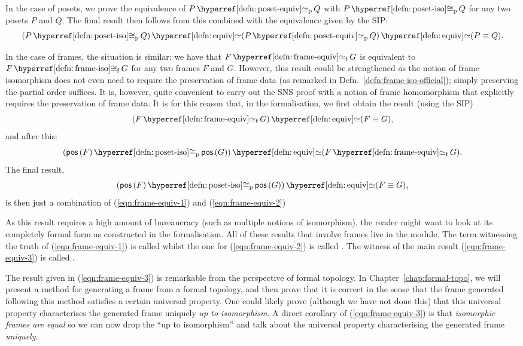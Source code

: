 In the case of posets, we prove the equivalence of $\posetequiv{P}{Q}$ with
$\posetiso{P}{Q}$ for any two posets $P$ and $Q$. The final result then follows from this
combined with the equivalence given by the SIP:
\begin{equation*}
  \typequiv{(\posetiso{P}{Q})}{\typequiv{(\posetequiv{P}{Q})}{(P \equiv Q)}}.
\end{equation*}

In the case of frames, the situation is similar: we have that $\frameequiv{F}{G}$ is
equivalent to $\frameiso{F}{G}$ for any two frames $F$ and $G$. However, this result could
be strengthened as the notion of frame isomorphism does not even need to require the
preservation of frame data (as remarked in Defn.~\ref{defn:frame-iso-official}); simply
preserving the partial order suffices. It is, however, quite convenient to carry out the
SNS proof with a notion of frame homomorphism that explicitly requires the preservation of
frame data. It is for this reason that, in the \veragda{} formalisation, we first obtain
the result (using the SIP)
\begin{equation}\label{eqn:frame-equiv-1}
  \typequiv{(\frameequiv{F}{G})}{(F \equiv G)},
\end{equation}
and after this:
\begin{equation}\label{eqn:frame-equiv-2}
  \typequiv{(\posetiso{\posof{F}}{\posof{G}})}{(\frameequiv{F}{G})}.
\end{equation}
The final result,
\begin{equation}\label{eqn:frame-equiv-3}
  \typequiv{(\posetiso{\posof{F}}{\posof{G}})}{(F \equiv G)},
\end{equation}
is then just a combination of (\ref{eqn:frame-equiv-1}) and (\ref{eqn:frame-equiv-2})

As this result requires a high amount of bureaucracy (such as multiple notions of
isomorphism), the reader might want to look at its completely formal form as constructed
in the \veragda{} formalisation. All of these results that involve frames live in the
 module. The term witnessing the truth of (\ref{eqn:frame-equiv-1}) is
called  whilst the one for (\ref{eqn:frame-equiv-2}) is called
. The witness of the main result (\ref{eqn:frame-equiv-3}) is called
.

The result given in (\ref{eqn:frame-equiv-3}) is remarkable from the perspective of formal
topology. In Chapter~\ref{chap:formal-topo}, we will present a method for generating a
frame from a formal topology, and then prove that it is correct in the sense that the
frame generated following this method satisfies a certain universal property. One could
likely prove (although we have not done this) that this universal property characterises
the generated frame uniquely \emph{up to isomorphism}. A direct corollary of
(\ref{eqn:frame-equiv-3}) is that \emph{isomorphic frames are equal} so we can now drop
the ``up to isomorphism'' and talk about the universal property characterising the
generated frame \emph{uniquely}.


